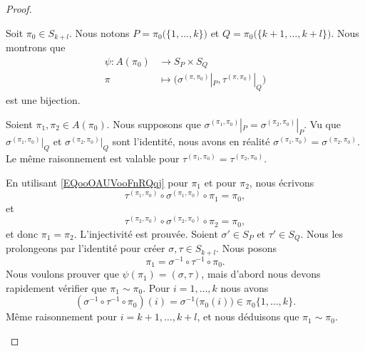 \begin{proof}
\begin{subproof}
		Soit \( \pi_0\in S_{k+l}\). Nous notons \( P=\pi_0\big( \{ 1,\ldots,k \} \big)\) et \( Q=\pi_0\big( \{ k+1,\ldots,k+l \} \big)\). Nous montrons que
		\begin{equation}
			\begin{aligned}
				\psi\colon A(\pi_0) & \to S_P\times S_Q                                                 \\
				\pi                 & \mapsto \big( \sigma^{(\pi,\pi_0)}|_P,\tau^{(\pi,\pi_0)}|_Q \big)
			\end{aligned}
		\end{equation}
		est une bijection.

		\begin{subproof}
			\spitem[Injective]
			Soient \( \pi_1,\pi_2\in A(\pi_0)\). Nous supposons que \( \sigma^{(\pi_1,\pi_0)}|_P=\sigma^{(\pi_2,\pi_0)}|_P\). Vu que \( \sigma^{(\pi_1,\pi_0)}|_Q\) et \( \sigma^{(\pi_2,\pi_0)}|_Q\) sont l'identité, nous avons en réalité \( \sigma^{(\pi_1,\pi_0)}=\sigma^{(\pi_2,\pi_0)}\). Le même raisonnement est valable pour \( \tau^{(\pi_1,\pi_0)}=\tau^{(\pi_2,\pi_0)}\).

			En utilisant \eqref{EQooOAUVooFnRQqj} pour \( \pi_1\) et pour \( \pi_2\), nous écrivons
			\begin{equation}
				\tau^{(\pi_1,\pi_0)}\circ\sigma^{(\pi_1,\pi_0)}\circ\pi_1=\pi_0,
			\end{equation}
			et
			\begin{equation}
				\tau^{(\pi_2,\pi_0)}\circ\sigma^{(\pi_2,\pi_0)}\circ\pi_2=\pi_0,
			\end{equation}
			et donc \( \pi_1=\pi_2\). L'injectivité est prouvée.
			\spitem[Surjective]
			Soient \( \sigma'\in S_P\) et \( \tau'\in S_Q\). Nous les prolongeons par l'identité pour créer \( \sigma,\tau\in S_{k+l}\). Nous posons
			\begin{equation}
				\pi_1=\sigma^{-1}\circ\tau^{-1}\circ\pi_0.
			\end{equation}
			Nous voulons prouver que \( \psi(\pi_1)=(\sigma,\tau)\), mais d'abord nous devons rapidement vérifier que \( \pi_1\sim\pi_0\). Pour \( i=1,\ldots,k\) nous avons
			\begin{equation}
				(\sigma^{-1}\circ\tau^{-1}\circ\pi_0)(i)=\sigma^{-1}\big( \pi_0(i) \big)\in\pi_0\{ 1,\ldots,k \}.
			\end{equation}
			Même raisonnement pour \( i=k+1,\ldots,k+l\), et nous déduisons que \( \pi_1\sim\pi_0\).


\end{subproof}
\end{subproof}
\end{proof}
